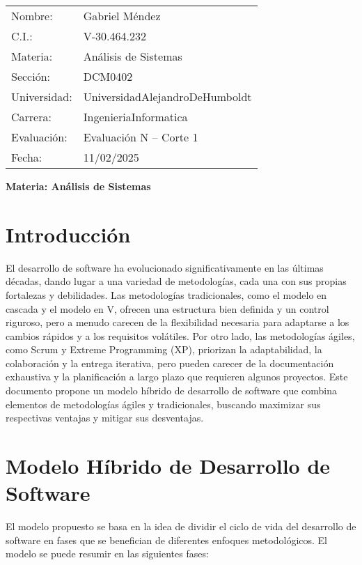 \documentclass[12pt, spanish]{article}
\begin{document}
\begin{tabular}{ll}
Nombre: & Gabriel Méndez \\
C.I.: & V-30.464.232 \\
Materia: & Análisis de Sistemas \\
Sección: & DCM0402 \\
Universidad: & UniversidadAlejandroDeHumboldt \\
Carrera: & IngenieriaInformatica \\
Evaluación: & Evaluación N\textdegree1 – Corte 1 \\
Fecha: & 11/02/2025
\end{tabular}

\vspace{2cm}
\begin{center}
\Large \textbf{{Materia: Análisis de Sistemas}}
\end{center}

\section{Introducción}

El desarrollo de software ha evolucionado significativamente en las últimas décadas, dando lugar a una variedad de metodologías, cada una con sus propias fortalezas y debilidades. Las metodologías tradicionales, como el modelo en cascada y el modelo en V, ofrecen una estructura bien definida y un control riguroso, pero a menudo carecen de la flexibilidad necesaria para adaptarse a los cambios rápidos y a los requisitos volátiles. Por otro lado, las metodologías ágiles, como Scrum y Extreme Programming (XP), priorizan la adaptabilidad, la colaboración y la entrega iterativa, pero pueden carecer de la documentación exhaustiva y la planificación a largo plazo que requieren algunos proyectos.  Este documento propone un modelo híbrido de desarrollo de software que combina elementos de metodologías ágiles y tradicionales, buscando maximizar sus respectivas ventajas y mitigar sus desventajas.

\section{Modelo Híbrido de Desarrollo de Software}

El modelo propuesto se basa en la idea de dividir el ciclo de vida del desarrollo de software en fases que se benefician de diferentes enfoques metodológicos.  El modelo se puede resumir en las siguientes fases:
\end{document}
